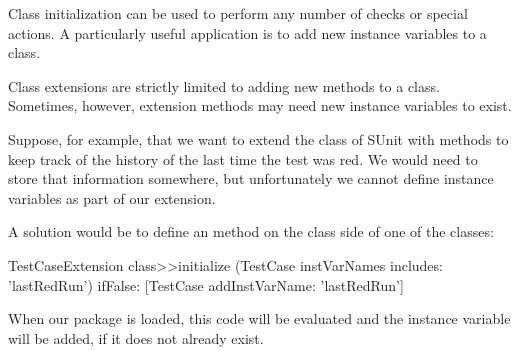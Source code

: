 \documentclass[a4paper,10pt,twoside]{book}
\begin{document}

Class initialization can be used to perform any number of checks or special actions.
A particularly useful application is to add new instance variables to a class.

Class extensions are strictly limited to adding new methods to a class.
Sometimes, however, extension methods may need new instance variables to exist.

Suppose, for example, that we want to extend the  class of SUnit with methods to keep track of the history of the last time the test was red.  We would need to store that information somewhere, but unfortunately we cannot define instance variables as part of our extension.

A solution would be to define an  method on the class side of one of the classes:

\begin{code}{}
TestCaseExtension class>>initialize
	(TestCase instVarNames includes: 'lastRedRun') 
		ifFalse: [TestCase addInstVarName: 'lastRedRun']
\end{code}

When our package is loaded, this code will be evaluated and the instance variable will be added, if it does not already exist.






\end{document}
